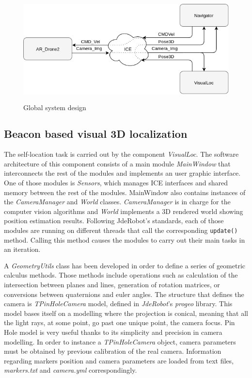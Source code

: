 \documentclass{styles/svproc}
\begin{document}
        \begin{figure}[h]
          \begin{center}
            {\includegraphics[width=\linewidth]{interactuacionproj.png}}
          \end{center}
          \caption{Global system design}
	\end{figure}
        
\subsection{Beacon based visual 3D localization}

	The self-location task is carried out by the component \textit{VisualLoc}. The software architecture of this component consists of a main module \textit{MainWindow} that interconnects the rest of the modules and implements an user graphic interface. One of those modules is \textit{Sensors}, which manages ICE interfaces and shared memory between the rest of the modules. MainWindow also contains instances of the \textit{CameraManager} and \textit{World} classes. \textit{CameraManager} is in charge for the computer vision algorithms and \textit{World} implements a 3D rendered world showing position estimation results. Following JdeRobot's standards, each of those modules are running on different threads that call the corresponding \texttt{update()} method. Calling this method causes the modules to carry out their main tasks in an iteration.
	
	A \textit{GeometryUtils} class has been developed in order to define a series of geometric calculus methods. Those methods include operations such as calculation of the intersection between planes and lines, generation of rotation matrices, or conversions between quaternions and euler angles. The structure that defines the camera is \textit{TPinHoleCamera} model, defined in \textit{JdeRobot}'s \textit{progeo} library. This model bases itself on a modelling where the projection is conical, meaning that all the light rays, at some point, go past one unique point, the camera focus. Pin Hole model is very useful thanks to its simplicity and precision in camera modelling. In order to instance a \textit{TPinHoleCamera} object, camera parameters must be obtained by previous calibration of the real camera. Information regarding markers position and camera parameters are loaded from text files, \textit{markers.txt} and \textit{camera.yml} correspondingly.
	
\end{document}
